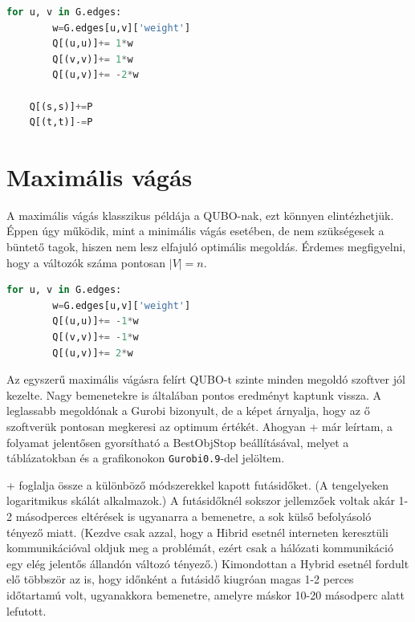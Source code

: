 \begin{lstlisting}[language=python,caption=Minimális vágás QUBO előállítása,label=code:minCutQUBO]
	for u, v in G.edges:
		w=G.edges[u,v]['weight']
		Q[(u,u)]+= 1*w
		Q[(v,v)]+= 1*w
		Q[(u,v)]+= -2*w
	
	Q[(s,s)]+=P
	Q[(t,t)]-=P
\end{lstlisting}

\section{Maximális vágás}\label{sec:practiceMaxCut}

A maximális vágás klasszikus példája a QUBO-nak, ezt könnyen elintézhetjük.
Éppen úgy működik, mint a minimális vágás esetében, de nem szükségesek a büntető tagok, hiszen nem lesz elfajuló optimális megoldás.
Érdemes megfigyelni, hogy a változók száma pontosan $|V|=n$.

\begin{lstlisting}[language=python,caption=Maximális vágás QUBO előállítása,label=code:maxCutQUBO]
	for u, v in G.edges:
		w=G.edges[u,v]['weight']
		Q[(u,u)]+= -1*w
		Q[(v,v)]+= -1*w
		Q[(u,v)]+= 2*w
\end{lstlisting}


Az egyszerű maximális vágásra felírt QUBO-t szinte minden megoldó szoftver jól kezelte. Nagy bemenetekre is általában pontos eredményt kaptunk vissza. A leglassabb megoldónak a Gurobi bizonyult, de a képet árnyalja, hogy az ő szoftverük pontosan megkeresi az optimum értékét. Ahogyan \az+ már leírtam, a folyamat jelentősen gyorsítható a BestObjStop beállításával, melyet a táblázatokban és a grafikonokon \verb+Gurobi0.9+-del jelöltem.

\Az+ foglalja össze a különböző módszerekkel kapott futásidőket. (A tengelyeken logaritmikus skálát alkalmazok.) A futásidőknél sokszor jellemzőek voltak akár 1-2 másodperces eltérések is ugyanarra a bemenetre, a sok külső befolyásoló tényező miatt. (Kezdve csak azzal, hogy a Hibrid esetnél interneten keresztüli kommunikációval oldjuk meg a problémát, ezért csak a hálózati kommunikáció egy elég jelentős állandón változó tényező.) Kimondottan a Hybrid esetnél fordult elő többször az is, hogy időnként a futásidő kiugróan magas 1-2 perces időtartamú volt, ugyanakkora bemenetre, amelyre máskor 10-20 másodperc alatt lefutott.

